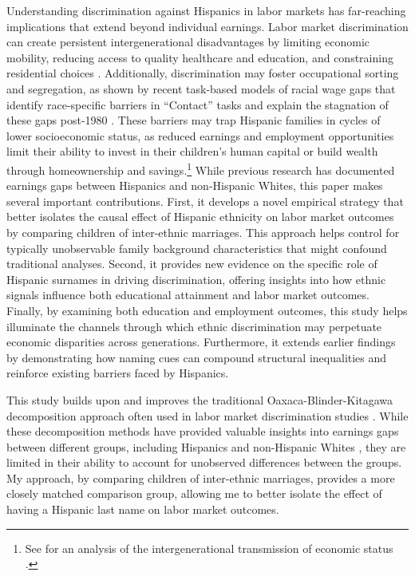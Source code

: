 Understanding discrimination against Hispanics in labor markets has far-reaching implications that extend beyond individual earnings. Labor market discrimination can create persistent intergenerational disadvantages by limiting economic mobility, reducing access to quality healthcare and education, and constraining residential choices \autocite{chettyUnitedStatesStill2014, chettyEffectsExposureBetter2016,chettyFadingAmericanDream2017,bowles2002inheritance, djajic2003assimilation}. Additionally, discrimination may foster occupational sorting and segregation, as shown by recent task-based models of racial wage gaps that identify race-specific barriers in “Contact” tasks and explain the stagnation of these gaps post-1980 \autocite{hurst2024task}. These barriers may trap Hispanic families in cycles of lower socioeconomic status, as reduced earnings and employment opportunities limit their ability to invest in their children's human capital or build wealth through homeownership and savings.\footnote{See \textcite{bowles2002inheritance} for an analysis of the intergenerational transmission of economic status .} While previous research has documented earnings gaps between Hispanics and non-Hispanic Whites, this paper makes several important contributions. First, it develops a novel empirical strategy that better isolates the causal effect of Hispanic ethnicity on labor market outcomes by comparing children of inter-ethnic marriages. This approach helps control for typically unobservable family background characteristics that might confound traditional analyses. Second, it provides new evidence on the specific role of Hispanic surnames in driving discrimination, offering insights into how ethnic signals influence both educational attainment and labor market outcomes. Finally, by examining both education and employment outcomes, this study helps illuminate the channels through which ethnic discrimination may perpetuate economic disparities across generations. Furthermore, it extends earlier findings by demonstrating how naming cues can compound structural inequalities and reinforce existing barriers faced by Hispanics.

This study builds upon and improves the traditional Oaxaca-Blinder-Kitagawa decomposition approach often used in labor market discrimination studies \autocite{oaxaca1973male,blinder1973wage,kitagawa1955components}. While these decomposition methods have provided valuable insights into earnings gaps between different groups, including Hispanics and non-Hispanic Whites \autocite{davilaChangesRelativeEarnings2008}, they are limited in their ability to account for unobserved differences between the groups. My approach, by comparing children of inter-ethnic marriages, provides a more closely matched comparison group, allowing me to better isolate the effect of having a Hispanic last name on labor market outcomes.

